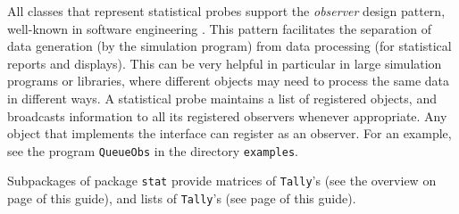 All classes that represent statistical probes
support the \emph{observer} design pattern, well-known
in software engineering \cite{iGAM98a}.
This pattern facilitates the separation of data generation (by the 
simulation program) from data processing (for statistical reports and
displays).  This can be very helpful in particular in large simulation 
programs or libraries, where different objects may need to process 
the same data in different ways.  
A statistical probe maintains a list of registered 
objects, and broadcasts information to all its registered
observers whenever appropriate.  %
Any object that implements the interface 
can register as an observer. For an example, see the program 
\texttt{QueueObs} in the directory \texttt{examples}.

Subpackages of package \texttt{stat} provide matrices of \texttt{Tally}'s
(see the overview on page \pageref{over-mat-tal} of this guide),
and lists of \texttt{Tally}'s (see page \pageref{over-li-tal} of this guide).



\begin{comment}

When writing complex simulation programs, in data generation portions,
one uses the statistical
probes as usual but with observation notification turned on.  To turn
on observation notification, one simply calls
\externalmethod{umontreal.iro.lecuyer.stat}{StatProbe}{notifyObs}{}
on the probes.  In this mode, a probe becomes a \emph{distribution
  agency} which broadcasts received observations to
all \emph{observers} that registered to it.  It will also fulfill its
collector functionality unless it is disabled explicitly by calling
the
\externalmethod{umontreal.iro.lecuyer.stat}{StatProbe}{stopCollectStat}{}
method.
When the statistical collection is disabled, the probes are only
distribution agencies.

Data processing parts of the program are implemented through
observers. An observer is a class
implementing the \externalclass{java.util}{Observer} interface.  It
can be registered to any class extending
\externalclass{java.util}{Observable}, including
\externalclass{umontreal.iro.lecuyer.stat}{StatProbe}.
The observed value is passed
to the observers through the second argument of the
\externalmethod{java.util}{Observer}{update}{} method which is an
\texttt{Object}.  The argument must then be
type-casted to a \texttt{Double} wrapper object
before the observation value can be extracted.

\end{comment}
